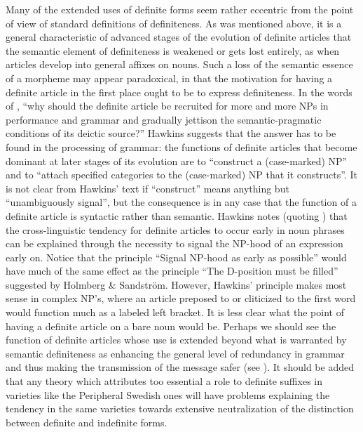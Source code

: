 Many of the extended uses of definite forms seem rather eccentric from the point of view of standard definitions of definiteness. As was mentioned above, it is a general characteristic of advanced stages of the evolution of definite articles that the semantic element of definiteness is weakened or gets lost entirely, as when articles develop into general affixes on nouns. Such a loss of the semantic essence of a morpheme may appear paradoxical, in that the motivation for having a definite article in the first place ought to be to express definiteness. In the words of \citet[91]{Hawkins2004}, “why should the definite article be recruited for more and more NPs in performance and grammar and gradually jettison the semantic-pragmatic conditions of its deictic source?”  Hawkins suggests that the answer has to be found in the processing of grammar: the functions of definite articles that become dominant at later stages of its evolution are to “construct a (case-marked) NP” and to “attach specified categories to the (case-marked) NP that it constructs”. It is not clear from Hawkins’ text if “construct” means anything but “unambiguously signal”, but the consequence is in any case that the function of a definite article is syntactic rather than semantic. Hawkins notes (quoting \citet[64]{Lyons1999}) that the cross-linguistic tendency for definite articles to occur early in noun phrases can be explained through the necessity to signal the NP-hood of an expression early on. Notice that the principle “Signal NP-hood as early as possible” would have much of the same effect as the principle “The D-position must be filled” suggested by Holmberg \& Sandström. However, Hawkins’ principle makes most sense in complex NP’s, where an article preposed to or cliticized to the first word would function much as a labeled left bracket. It is less clear what the point of having a definite article on a bare noun would be. Perhaps we should see the function of definite articles whose use is extended beyond what is warranted by semantic definiteness as enhancing the general level of redundancy in grammar and thus making the transmission of the message safer (see \citet[9-11]{Dahl2004}). It should be added that any theory which attributes too essential a role to definite suffixes in varieties like the Peripheral Swedish ones will have problems explaining the tendency in the same varieties towards extensive neutralization of the distinction between definite and indefinite forms. 

